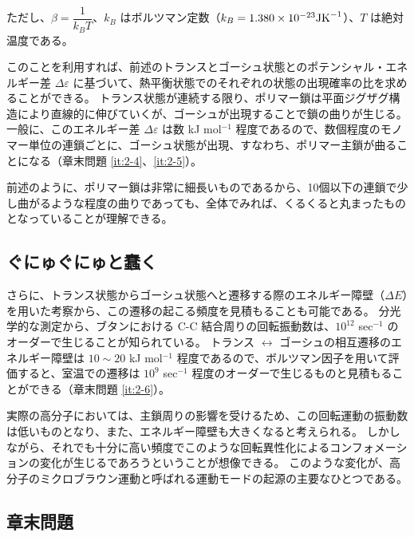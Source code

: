 \documentclass[a4paper,11pt]{ltjsarticle}
\begin{document}
ただし、$\beta=\dfrac{1}{k_B T}$、$k_B$ はボルツマン定数（$k_B =1.380 \times 10^{-23} {\rm J K}^{-1}$）、$T$ は絶対温度である。

このことを利用すれば、前述のトランスとゴーシュ状態とのポテンシャル・エネルギー差 $\Delta \varepsilon$ に基づいて、熱平衡状態でのそれぞれの状態の出現確率の比を求めることができる。
トランス状態が連続する限り、ポリマー鎖は平面ジグザグ構造により直線的に伸びていくが、ゴーシュが出現することで鎖の曲りが生じる。
一般に、このエネルギー差 $\Delta \varepsilon$ は数 kJ mol$^{-1}$ 程度であるので、数個程度のモノマー単位の連鎖ごとに、ゴーシュ状態が出現、すなわち、ポリマー主鎖が曲ることになる（章末問題 \ref{it:2-4}、\ref{it:2-5}）。

前述のように、ポリマー鎖は非常に細長いものであるから、10個以下の連鎖で少し曲がるような程度の曲りであっても、全体でみれば、くるくると丸まったものとなっていることが理解できる。

\subsection{ぐにゅぐにゅと蠢く}

さらに、トランス状態からゴーシュ状態へと遷移する際のエネルギー障壁（$\Delta E$）を用いた考察から、この遷移の起こる頻度を見積もることも可能である。
分光学的な測定から、ブタンにおける C-C 結合周りの回転振動数は、$10^{12}$ sec$^{-1}$ のオーダーで生じることが知られている。
トランス $\leftrightarrow$ ゴーシュの相互遷移のエネルギー障壁は $10 \sim 20$ kJ mol$^{-1}$ 程度であるので、ボルツマン因子を用いて評価すると、室温での遷移は $10^{9}$ sec$^{-1}$ 程度のオーダーで生じるものと見積もることができる（章末問題 \ref{it:2-6}）。

実際の高分子においては、主鎖周りの影響を受けるため、この回転運動の振動数は低いものとなり、また、エネルギー障壁も大きくなると考えられる。
しかしながら、それでも十分に高い頻度でこのような回転異性化によるコンフォメーションの変化が生じるであろうということが想像できる。
このような変化が、高分子のミクロブラウン運動と呼ばれる運動モードの起源の主要なひとつである。

\subsection{章末問題}
\end{document}

